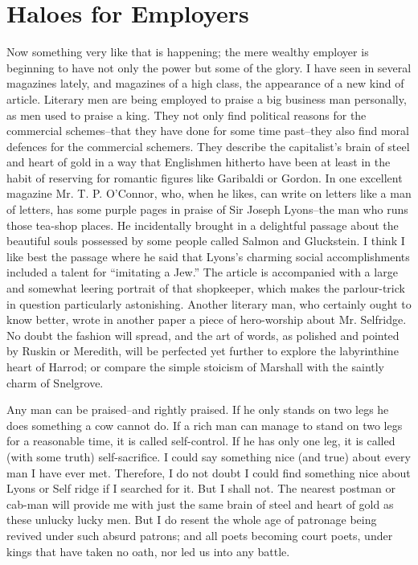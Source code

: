\documentclass{book}
\begin{document}
\section{Haloes for Employers}
Now something very like that is happening; the mere wealthy employer is beginning to have not only the power but some of the glory. I have seen in several magazines lately, and magazines of a high class, the appearance of a new kind of article. Literary men are being employed to praise a big business man personally, as men used to praise a king. They not only find political reasons for the commercial schemes–that they have done for some time past–they also find moral defences for the commercial schemers. They describe the capitalist’s brain of steel and heart of gold in a way that Englishmen hitherto have been at least in the habit of reserving for romantic figures like Garibaldi or Gordon. In one excellent magazine Mr. T. P. O’Connor, who, when he likes, can write on letters like a man of letters, has some purple pages in praise of Sir Joseph Lyons–the man who runs those tea-shop places. He incidentally brought in a delightful passage about the beautiful souls possessed by some people called Salmon and Gluckstein. I think I like best the passage where he said that Lyons’s charming social accomplishments included a talent for “imitating a Jew.” The article is accompanied with a large and somewhat leering portrait of that shopkeeper, which makes the parlour-trick in question particularly astonishing. Another literary man, who certainly ought to know better, wrote in another paper a piece of hero-worship about Mr. Selfridge. No doubt the fashion will spread, and the art of words, as polished and pointed by Ruskin or Meredith, will be perfected yet further to explore the labyrinthine heart of Harrod; or compare the simple stoicism of Marshall with the saintly charm of Snelgrove.

Any man can be praised–and rightly praised. If he only stands on two legs he does something a cow cannot do. If a rich man can manage to stand on two legs for a reasonable time, it is called self-control. If he has only one leg, it is called (with some truth) self-sacrifice. I could say something nice (and true) about every man I have ever met. Therefore, I do not doubt I could find something nice about Lyons or Self ridge if I searched for it. But I shall not. The nearest postman or cab-man will provide me with just the same brain of steel and heart of gold as these unlucky lucky men. But I do resent the whole age of patronage being revived under such absurd patrons; and all poets becoming court poets, under kings that have taken no oath, nor led us into any battle.
\end{document}

